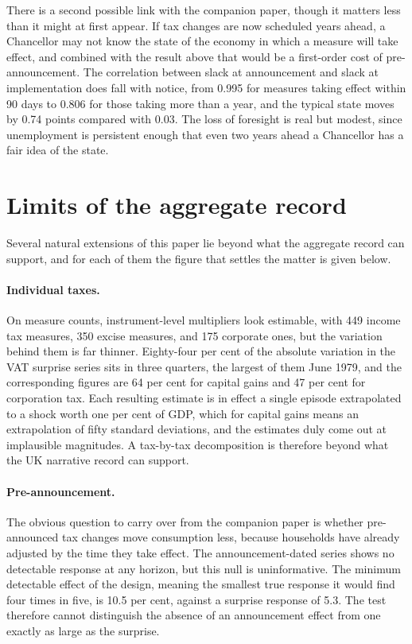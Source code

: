 \documentclass[11pt,a4paper]{article}
\begin{document}
There is a second possible link with the companion paper, though it matters less than it might at
first appear. If tax changes are now scheduled years ahead, a Chancellor may not know the state of
the economy in which a measure will take effect, and combined with the result above that would be a
first-order cost of pre-announcement. The correlation between slack at announcement and slack at
implementation does fall with notice, from 0.995 for measures taking effect within 90 days to 0.806
for those taking more than a year, and the typical state moves by 0.74 points compared with 0.03.
The loss of foresight is real but modest, since unemployment is persistent enough that even two
years ahead a Chancellor has a fair idea of the state.

\section{Limits of the aggregate record}\label{sec:limits}

Several natural extensions of this paper lie beyond what the aggregate record can support, and for
each of them the figure that settles the matter is given below.

\paragraph{Individual taxes.} On measure counts, instrument-level multipliers look estimable, with
449 income tax measures, 350 excise measures, and 175 corporate ones, but the variation behind them
is far thinner. Eighty-four per cent of the absolute variation in the VAT surprise series sits in
three quarters, the largest of them June 1979, and the corresponding figures are 64 per cent for
capital gains and 47 per cent for corporation tax. Each resulting estimate is in effect a single
episode extrapolated to a shock worth one per cent of GDP, which for capital gains means an
extrapolation of fifty standard deviations, and the estimates duly come out at implausible
magnitudes. A tax-by-tax decomposition is therefore beyond what the UK narrative record can support.

\paragraph{Pre-announcement.} The obvious question to carry over from the companion paper is whether
pre-announced tax changes move consumption less, because households have already adjusted by the
time they take effect. The announcement-dated series shows no detectable response at any horizon,
but this null is uninformative. The minimum detectable effect of the design, meaning the smallest
true response it would find four times in five, is 10.5 per cent, against a surprise response of
5.3. The test therefore cannot distinguish the absence of an announcement effect from one exactly as
large as the surprise.
\end{document}
